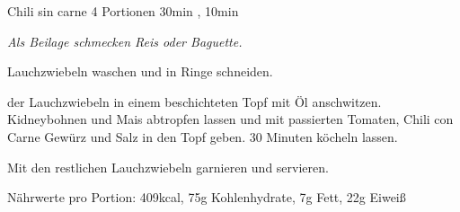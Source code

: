 \documentclass[../recipe-collections/cooking.tex]{subfiles}
\begin{document}
\begin{recipe}{Chili sin carne} {4 Portionen } {30min , 10min }

  \freeform{}\textit{Als Beilage schmecken Reis oder Baguette.}


  Lauchzwiebeln waschen und in Ringe schneiden.


   der Lauchzwiebeln in einem beschichteten Topf mit Öl anschwitzen.
  Kidneybohnen und Mais abtropfen lassen und mit passierten Tomaten, Chili con Carne Gewürz und Salz in den Topf geben.
  30 Minuten köcheln lassen.

  \newstep{}Mit den restlichen Lauchzwiebeln garnieren und servieren.

  \freeform{}\hrulefill{}

  \freeform{}
  Nährwerte pro Portion: 409kcal, 75g Kohlenhydrate, 7g Fett, 22g Eiweiß

\end{recipe}
\end{document}
